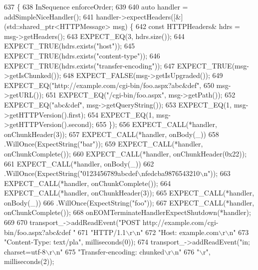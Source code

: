 \begin{DoxyCode}
637                                                \{
638   InSequence enforceOrder;
639 
640   \textcolor{keyword}{auto} handler = addSimpleNiceHandler();
641   handler->expectHeaders([&] (std::shared\_ptr<HTTPMessage> msg) \{
642       \textcolor{keyword}{const} HTTPHeaders& hdrs = msg->getHeaders();
643       EXPECT\_EQ(3, hdrs.size());
644       EXPECT\_TRUE(hdrs.exists(\textcolor{stringliteral}{"host"}));
645       EXPECT\_TRUE(hdrs.exists(\textcolor{stringliteral}{"content-type"}));
646       EXPECT\_TRUE(hdrs.exists(\textcolor{stringliteral}{"transfer-encoding"}));
647       EXPECT\_TRUE(msg->getIsChunked());
648       EXPECT\_FALSE(msg->getIsUpgraded());
649       EXPECT\_EQ(\textcolor{stringliteral}{"http://example.com/cgi-bin/foo.aspx?abc&def"},
650                 msg->getURL());
651       EXPECT\_EQ(\textcolor{stringliteral}{"/cgi-bin/foo.aspx"}, msg->getPath());
652       EXPECT\_EQ(\textcolor{stringliteral}{"abc&def"}, msg->getQueryString());
653       EXPECT\_EQ(1, msg->getHTTPVersion().first);
654       EXPECT\_EQ(1, msg->getHTTPVersion().second);
655     \});
656   EXPECT\_CALL(*handler, onChunkHeader(3));
657   EXPECT\_CALL(*handler, onBody(\_))
658     .WillOnce(ExpectString(\textcolor{stringliteral}{"bar"}));
659   EXPECT\_CALL(*handler, onChunkComplete());
660   EXPECT\_CALL(*handler, onChunkHeader(0x22));
661   EXPECT\_CALL(*handler, onBody(\_))
662     .WillOnce(ExpectString(\textcolor{stringliteral}{"0123456789abcdef\(\backslash\)nfedcba9876543210\(\backslash\)n"}));
663   EXPECT\_CALL(*handler, onChunkComplete());
664   EXPECT\_CALL(*handler, onChunkHeader(3));
665   EXPECT\_CALL(*handler, onBody(\_))
666     .WillOnce(ExpectString(\textcolor{stringliteral}{"foo"}));
667   EXPECT\_CALL(*handler, onChunkComplete());
668   onEOMTerminateHandlerExpectShutdown(*handler);
669 
670   transport\_->addReadEvent(\textcolor{stringliteral}{"POST http://example.com/cgi-bin/foo.aspx?abc&def "}
671                            \textcolor{stringliteral}{"HTTP/1.1\(\backslash\)r\(\backslash\)n"}
672                            \textcolor{stringliteral}{"Host: example.com\(\backslash\)r\(\backslash\)n"}
673                            \textcolor{stringliteral}{"Content-Type: text/pla"}, milliseconds(0));
674   transport\_->addReadEvent(\textcolor{stringliteral}{"in; charset=utf-8\(\backslash\)r\(\backslash\)n"}
675                            \textcolor{stringliteral}{"Transfer-encoding: chunked\(\backslash\)r\(\backslash\)n"}
676                            \textcolor{stringliteral}{"\(\backslash\)r"}, milliseconds(2));

\end{DoxyCode}

